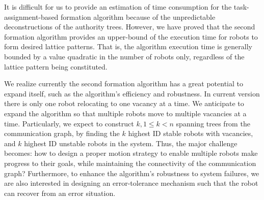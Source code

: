 It is difficult for us to provide an estimation of time consumption for the task-assignment-based formation algorithm because of the unpredictable deconstructions of the authority trees. 
%
However, we have proved that the second formation algorithm provides an upper-bound of the execution time for robots to form desired lattice patterns.  
%
That is, the algorithm execution time is generally bounded by a value quadratic in the number of robots only, regardless of the lattice pattern being constituted.


We realize currently the second formation algorithm has a great potential to expand itself, such as the algorithm's efficiency and robustness. 
%
In current version there is only one robot relocating to one vacancy at a time. 
%
We anticipate to expand the algorithm so that multiple robots move to multiple vacancies at a time. 
%
Particularly, we expect to construct $k, 1\leq k < n$ spanning trees from the communication graph, by finding the $k$ highest ID stable robots with vacancies,
and $k$ highest ID unstable robots in the system.
Thus, the major challenge becomes: how to design a proper motion strategy to enable multiple robots make progress to their goals, while maintaining the connectivity of the communication graph?
%
Furthermore, to enhance the algorithm's robustness to system failures, we are also interested in designing an error-tolerance mechanism such that the robot can recover from an error situation.